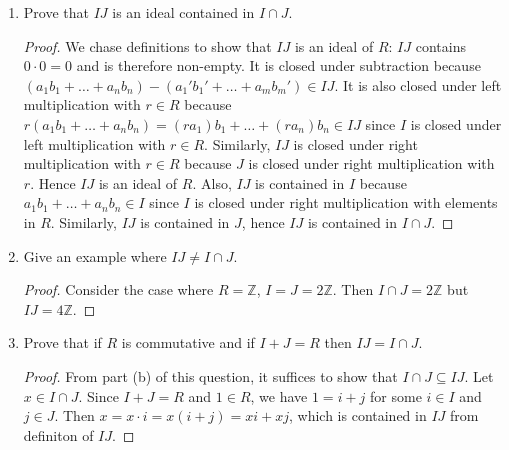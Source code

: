 \documentclass{article}
\begin{document}
\begin{enumerate}[label={\bf Q\arabic*:}]
\begin{enumerate}
      \item Prove that $IJ$ is an ideal contained in $I\cap J$.
        \begin{proof}
          We chase definitions to show that $IJ$ is an ideal of $R$: $IJ$
          contains $0\cdot0=0$ and is therefore non-empty. It is closed
          under subtraction because
          $(a_1b_1+\ldots+a_nb_n)-(a_1'b_1'+\ldots+a_mb_m')\in IJ$. It is
          also closed under left multiplication with $r\in R$ because
          $r(a_1b_1+\ldots+a_nb_n)=(ra_1)b_1+\ldots+(ra_n)b_n\in IJ$ since
          $I$ is closed under left multiplication with $r\in R$. Similarly,
          $IJ$ is closed under right multiplication with $r\in R$ because
          $J$ is closed under right multiplication with $r$. Hence $IJ$ is
          an ideal of $R$. Also, $IJ$ is contained in $I$ because
          $a_1b_1+\ldots+a_nb_n\in I$ since $I$ is closed under right
          multiplication with elements in $R$. Similarly, $IJ$ is contained
          in $J$, hence $IJ$ is contained in $I\cap J$.
        \end{proof}

      \item Give an example where $IJ\neq I\cap J$.
        \begin{proof}
          Consider the case where $R=\mathbb{Z}$, $I=J=2\mathbb{Z}$. Then
          $I\cap J=2\mathbb{Z}$ but $IJ=4\mathbb{Z}$.
        \end{proof}

      \item Prove that if $R$ is commutative and if $I+J=R$ then $IJ=I\cap
        J$.
        \begin{proof}
          From part (b) of this question, it suffices to show that
          $I\cap J\subseteq IJ$. Let $x\in I\cap J$. Since $I+J=R$ and
          $1\in R$, we have $1=i+j$ for some $i\in I$ and $j\in J$. Then
          $x=x\cdot i=x(i+j)=xi+xj$, which is contained in $IJ$ from
          definiton of $IJ$.
        \end{proof}
    \end{enumerate}
\end{enumerate}
\end{document}
